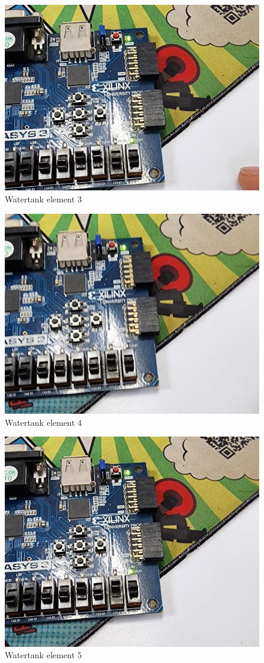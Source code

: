 \documentclass{article}
\begin{document}
\begin{multicols}{2}
	\begin{figure}[H]
		\centering
		\includegraphics[width=0.8\linewidth]{images/diagrams/watertank/watertank3.jpg}
		\caption{Watertank element 3}
		\label{Watertank element 3 Apendix}
	\end{figure}

	\begin{figure}[H]
		\centering
		\includegraphics[width=0.8\linewidth]{images/diagrams/watertank/watertank4.jpg}
		\caption{Watertank element 4}
		\label{Watertank element 4 Apendix}
	\end{figure}

	\begin{figure}[H]
		\centering
		\includegraphics[width=0.8\linewidth]{images/diagrams/watertank/watertank5.jpg}
		\caption{Watertank element 5}
		\label{Watertank element 5 Apendix}
	\end{figure}


\end{multicols}
\end{document}

